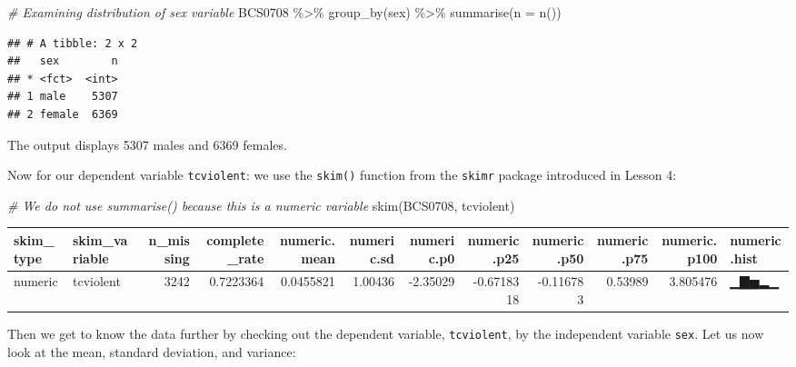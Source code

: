 \documentclass[
]{book}
\newenvironment{Shaded}{\begin{snugshade}}{\end{snugshade}}
\newcommand{\AttributeTok}[1]{\textcolor[rgb]{0.77,0.63,0.00}{#1}}
\newcommand{\CommentTok}[1]{\textcolor[rgb]{0.56,0.35,0.01}{\textit{#1}}}
\newcommand{\FunctionTok}[1]{\textcolor[rgb]{0.00,0.00,0.00}{#1}}
\newcommand{\NormalTok}[1]{#1}
\newcommand{\SpecialCharTok}[1]{\textcolor[rgb]{0.00,0.00,0.00}{#1}}
\begin{document}
\begin{Shaded}
\begin{Highlighting}[]
\CommentTok{\# Examining distribution of sex variable}
\NormalTok{BCS0708 }\SpecialCharTok{\%\textgreater{}\%} \FunctionTok{group\_by}\NormalTok{(sex) }\SpecialCharTok{\%\textgreater{}\%} \FunctionTok{summarise}\NormalTok{(}\AttributeTok{n =} \FunctionTok{n}\NormalTok{())}
\end{Highlighting}
\end{Shaded}

\begin{verbatim}
## # A tibble: 2 x 2
##   sex        n
## * <fct>  <int>
## 1 male    5307
## 2 female  6369
\end{verbatim}

The output displays 5307 males and 6369 females.

Now for our dependent variable \texttt{tcviolent}: we use the \texttt{skim()} function from the \texttt{skimr} package introduced in Lesson 4:

\begin{Shaded}
\begin{Highlighting}[]
\CommentTok{\# We do not use \textquotesingle{}summarise()\textquotesingle{} because this is a numeric variable}
\FunctionTok{skim}\NormalTok{(BCS0708, tcviolent)}
\end{Highlighting}
\end{Shaded}

\begin{tabular}{l|l|r|r|r|r|r|r|r|r|r|l}
\hline
skim\_type & skim\_variable & n\_missing & complete\_rate & numeric.mean & numeric.sd & numeric.p0 & numeric.p25 & numeric.p50 & numeric.p75 & numeric.p100 & numeric.hist\\
\hline
numeric & tcviolent & 3242 & 0.7223364 & 0.0455821 & 1.00436 & -2.35029 & -0.6718318 & -0.116783 & 0.53989 & 3.805476 & ▁▇▅▂▁\\
\hline
\end{tabular}

Then we get to know the data further by checking out the dependent variable, \texttt{tcviolent}, by the independent variable \texttt{sex}. Let us now look at the mean, standard deviation, and variance:
\end{document}
